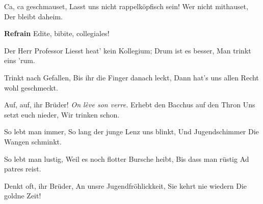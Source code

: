 \footnotemark [
ititle={Edite, bibite, collegiales}]

\beginverse
Ca, ca geschmauset,
Lasst uns nicht rappelköpfisch sein!
Wer nicht mithauset,
Der bleibt daheim.
\endverse

\beginchorus
\textbf{Refrain}
Edite, bibite, collegiales!
\endchorus

\beginverse
Der Herr Professor
Liesst heat' kein Kollegium;
Drum ist es besser,
Man trinkt eins 'rum.
\endverse

\beginverse
Trinkt nach Gefallen,
Bis ihr die Finger danach leckt,
Dann hat's uns allen
Recht wohl geschmeckt.
\endverse

\beginverse
Auf, auf, ihr Brüder!
\emph{On lève son verre.}
Erhebt den Bacchus auf den Thron
Uns setzt euch nieder,
Wir trinken schon.
\endverse

\beginverse
So lebt man immer,
So lang der junge Lenz uns blinkt,
Und Jugendschimmer
Die Wangen schminkt.
\endverse

\beginverse
So lebt man lustig,
Weil es noch flotter Bursche heibt,
Bis dass man rüstig
Ad patres reist.
\endverse

\beginverse
Denkt oft, ihr Brüder,
An unsre Jugendfröhlickkeit,
Sie kehrt nie wiedern
Die goldne Zeit!
\endverse
\endsong